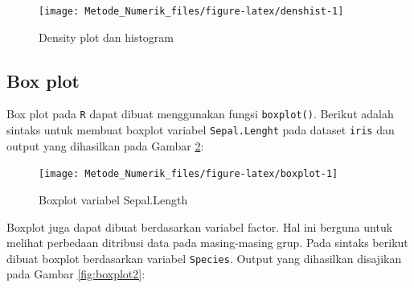 \documentclass[]{book}
\newenvironment{Shaded}{\begin{snugshade}}{\end{snugshade}}
\newcommand{\CommentTok}[1]{\textcolor[rgb]{0.56,0.35,0.01}{\textit{#1}}}
\newcommand{\DataTypeTok}[1]{\textcolor[rgb]{0.13,0.29,0.53}{#1}}
\newcommand{\KeywordTok}[1]{\textcolor[rgb]{0.13,0.29,0.53}{\textbf{#1}}}
\newcommand{\NormalTok}[1]{#1}
\newcommand{\OperatorTok}[1]{\textcolor[rgb]{0.81,0.36,0.00}{\textbf{#1}}}
\newcommand{\OtherTok}[1]{\textcolor[rgb]{0.56,0.35,0.01}{#1}}
\newcommand{\StringTok}[1]{\textcolor[rgb]{0.31,0.60,0.02}{#1}}
\theoremstyle{definition}
\theoremstyle{definition}
\theoremstyle{definition}
\theoremstyle{remark}
\begin{document}
\begin{Shaded}
\end{Shaded}

\begin{figure}

{\centering \texttt{[image: Metode\_Numerik\_files/figure-latex/denshist-1]} 

}

\caption{Density plot dan histogram}\label{fig:denshist}
\end{figure}

\hypertarget{boxplot}{%
\subsection{Box plot}\label{boxplot}}

Box plot pada \texttt{R} dapat dibuat menggunakan fungsi \texttt{boxplot()}. Berikut adalah sintaks untuk membuat boxplot variabel \texttt{Sepal.Lenght} pada dataset \texttt{iris} dan output yang dihasilkan pada Gambar \ref{fig:boxplot}:

\begin{Shaded}
\end{Shaded}

\begin{figure}

{\centering \texttt{[image: Metode\_Numerik\_files/figure-latex/boxplot-1]} 

}

\caption{Boxplot variabel Sepal.Length}\label{fig:boxplot}
\end{figure}

Boxplot juga dapat dibuat berdasarkan variabel factor. Hal ini berguna untuk melihat perbedaan ditribusi data pada masing-masing grup. Pada sintaks berikut dibuat boxplot berdasarkan variabel \texttt{Species}. Output yang dihasilkan disajikan pada Gambar \ref{fig:boxplot2}:
\end{document}

